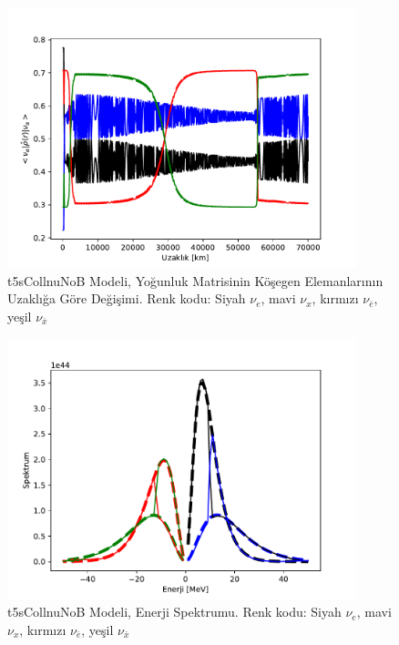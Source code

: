 \newpage
\begin{figure}[hbt!]
    \centering
    \includegraphics[width=0.9\textwidth]{figures/t5sCollnuNoB_distdiag10.pdf}
    \caption[t5sCollnuNoB Modeli, Yoğunluk Matrisinin Köşegen Elemanlarının Uzaklığa Göre Değişimi.]{t5sCollnuNoB Modeli, Yoğunluk Matrisinin Köşegen Elemanlarının Uzaklığa Göre Değişimi. Renk kodu: Siyah $ \nu_{e} $, mavi $ \nu_{x} $, kırmızı $ \nu_{\bar{e}} $, yeşil $ \nu_{\bar{x}} $}
    \label{fig:t5sCollnuNoB_distdiag10}
\end{figure}
\begin{figure}[hbt!]
    \centering
    \includegraphics[width=0.9\textwidth]{figures/t5sCollnuNoB_spectrum.pdf}
    \caption[t5sCollnuNoB Modeli, Enerji Spektrumu.]{t5sCollnuNoB Modeli, Enerji Spektrumu. Renk kodu: Siyah $ \nu_{e} $, mavi $ \nu_{x} $, kırmızı $ \nu_{\bar{e}} $, yeşil $ \nu_{\bar{x}} $}
    \label{fig:t5sCollnuNoB_spectrum}
\end{figure}

